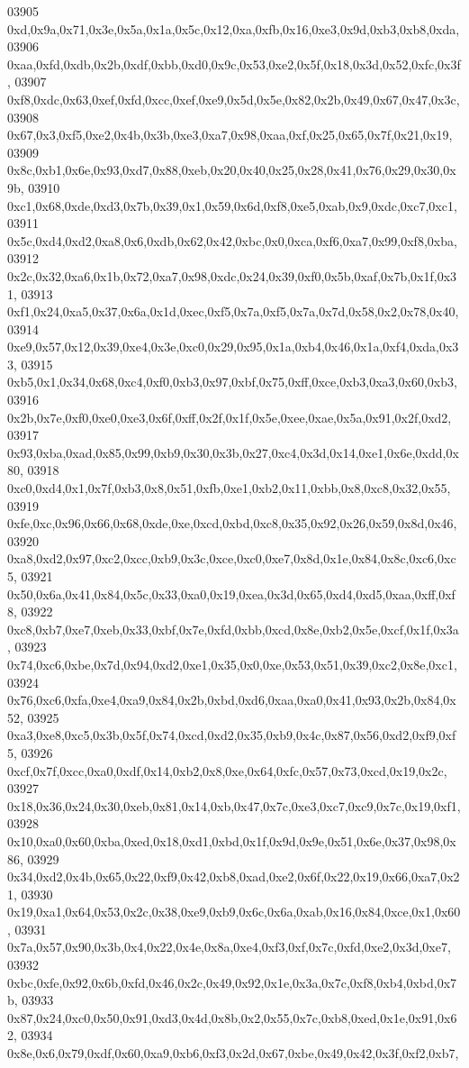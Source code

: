 \begin{DoxyCode}
03905   0xd,0x9a,0x71,0x3e,0x5a,0x1a,0x5c,0x12,0xa,0xfb,0x16,0xe3,0x9d,0xb3,0xb8,0xda,
03906   0xaa,0xfd,0xdb,0x2b,0xdf,0xbb,0xd0,0x9c,0x53,0xe2,0x5f,0x18,0x3d,0x52,0xfc,0x3f,
03907   0xf8,0xdc,0x63,0xef,0xfd,0xcc,0xef,0xe9,0x5d,0x5e,0x82,0x2b,0x49,0x67,0x47,0x3c,
03908   0x67,0x3,0xf5,0xe2,0x4b,0x3b,0xe3,0xa7,0x98,0xaa,0xf,0x25,0x65,0x7f,0x21,0x19,
03909   0x8c,0xb1,0x6e,0x93,0xd7,0x88,0xeb,0x20,0x40,0x25,0x28,0x41,0x76,0x29,0x30,0x9b,
03910   0xc1,0x68,0xde,0xd3,0x7b,0x39,0x1,0x59,0x6d,0xf8,0xe5,0xab,0x9,0xdc,0xc7,0xc1,
03911   0x5c,0xd4,0xd2,0xa8,0x6,0xdb,0x62,0x42,0xbc,0x0,0xca,0xf6,0xa7,0x99,0xf8,0xba,
03912   0x2c,0x32,0xa6,0x1b,0x72,0xa7,0x98,0xdc,0x24,0x39,0xf0,0x5b,0xaf,0x7b,0x1f,0x31,
03913   0xf1,0x24,0xa5,0x37,0x6a,0x1d,0xec,0xf5,0x7a,0xf5,0x7a,0x7d,0x58,0x2,0x78,0x40,
03914   0xe9,0x57,0x12,0x39,0xe4,0x3e,0xc0,0x29,0x95,0x1a,0xb4,0x46,0x1a,0xf4,0xda,0x33,
03915   0xb5,0x1,0x34,0x68,0xc4,0xf0,0xb3,0x97,0xbf,0x75,0xff,0xce,0xb3,0xa3,0x60,0xb3,
03916   0x2b,0x7e,0xf0,0xe0,0xe3,0x6f,0xff,0x2f,0x1f,0x5e,0xee,0xae,0x5a,0x91,0x2f,0xd2,
03917   0x93,0xba,0xad,0x85,0x99,0xb9,0x30,0x3b,0x27,0xc4,0x3d,0x14,0xe1,0x6e,0xdd,0x80,
03918   0xc0,0xd4,0x1,0x7f,0xb3,0x8,0x51,0xfb,0xe1,0xb2,0x11,0xbb,0x8,0xc8,0x32,0x55,
03919   0xfe,0xc,0x96,0x66,0x68,0xde,0xe,0xcd,0xbd,0xc8,0x35,0x92,0x26,0x59,0x8d,0x46,
03920   0xa8,0xd2,0x97,0xc2,0xcc,0xb9,0x3c,0xce,0xc0,0xe7,0x8d,0x1e,0x84,0x8c,0xc6,0xc5,
03921   0x50,0x6a,0x41,0x84,0x5c,0x33,0xa0,0x19,0xea,0x3d,0x65,0xd4,0xd5,0xaa,0xff,0xf8,
03922   0xc8,0xb7,0xe7,0xeb,0x33,0xbf,0x7e,0xfd,0xbb,0xcd,0x8e,0xb2,0x5e,0xcf,0x1f,0x3a,
03923   0x74,0xc6,0xbe,0x7d,0x94,0xd2,0xe1,0x35,0x0,0xe,0x53,0x51,0x39,0xc2,0x8e,0xc1,
03924   0x76,0xc6,0xfa,0xe4,0xa9,0x84,0x2b,0xbd,0xd6,0xaa,0xa0,0x41,0x93,0x2b,0x84,0x52,
03925   0xa3,0xe8,0xc5,0x3b,0x5f,0x74,0xcd,0xd2,0x35,0xb9,0x4c,0x87,0x56,0xd2,0xf9,0xf5,
03926   0xcf,0x7f,0xcc,0xa0,0xdf,0x14,0xb2,0x8,0xe,0x64,0xfc,0x57,0x73,0xcd,0x19,0x2c,
03927   0x18,0x36,0x24,0x30,0xeb,0x81,0x14,0xb,0x47,0x7c,0xe3,0xc7,0xc9,0x7c,0x19,0xf1,
03928   0x10,0xa0,0x60,0xba,0xed,0x18,0xd1,0xbd,0x1f,0x9d,0x9e,0x51,0x6e,0x37,0x98,0x86,
03929   0x34,0xd2,0x4b,0x65,0x22,0xf9,0x42,0xb8,0xad,0xe2,0x6f,0x22,0x19,0x66,0xa7,0x21,
03930   0x19,0xa1,0x64,0x53,0x2c,0x38,0xe9,0xb9,0x6c,0x6a,0xab,0x16,0x84,0xce,0x1,0x60,
03931   0x7a,0x57,0x90,0x3b,0x4,0x22,0x4e,0x8a,0xe4,0xf3,0xf,0x7c,0xfd,0xe2,0x3d,0xe7,
03932   0xbc,0xfe,0x92,0x6b,0xfd,0x46,0x2c,0x49,0x92,0x1e,0x3a,0x7c,0xf8,0xb4,0xbd,0x7b,
03933   0x87,0x24,0xc0,0x50,0x91,0xd3,0x4d,0x8b,0x2,0x55,0x7c,0xb8,0xed,0x1e,0x91,0x62,
03934   0x8e,0x6,0x79,0xdf,0x60,0xa9,0xb6,0xf3,0x2d,0x67,0xbe,0x49,0x42,0x3f,0xf2,0xb7,

\end{DoxyCode}
